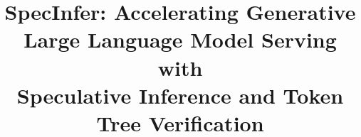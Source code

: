 \documentclass[sigplan,10pt]{acmart}
\newcommand{\Sys}{SpecInfer\xspace}
\theoremstyle{plain}
\theoremstyle{definition}
\theoremstyle{remark}
\begin{document}
\title{
\Sys: Accelerating Generative Large Language Model Serving with\\Speculative Inference and Token Tree Verification}

\date{}


\maketitle



%




%





 
\end{document}
